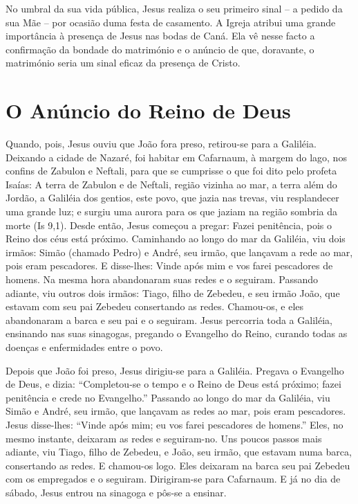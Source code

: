 \documentclass{rosario}
\begin{document}

No umbral da sua vida pública, Jesus realiza o seu primeiro sinal -- a pedido da sua Mãe -- por ocasião duma festa de casamento.
A Igreja atribui uma grande importância à presença de Jesus nas bodas de Caná.
Ela vê nesse facto a confirmação da bondade do matrimónio e o anúncio de que, doravante, o matrimónio seria um sinal eficaz da presença de Cristo.


\section{O Anúncio do Reino de Deus}


Quando, pois, Jesus ouviu que João fora preso, retirou-se para a Galiléia.
Deixando a cidade de Nazaré, foi habitar em Cafarnaum, à margem do lago, nos confins de Zabulon e Neftali,
para que se cumprisse o que foi dito pelo profeta Isaías:
A terra de Zabulon e de Neftali, região vizinha ao mar, a terra além do Jordão, a Galiléia dos gentios,
este povo, que jazia nas trevas, viu resplandecer uma grande luz;
e surgiu uma aurora para os que jaziam na região sombria da morte (Is 9,1).
Desde então, Jesus começou a pregar:
Fazei penitência, pois o Reino dos céus está próximo.
Caminhando ao longo do mar da Galiléia, viu dois irmãos:
Simão (chamado Pedro) e André, seu irmão, que lançavam a rede ao mar, pois eram pescadores.
E disse-lhes:
Vinde após mim e vos farei pescadores de homens.
Na mesma hora abandonaram suas redes e o seguiram.
Passando adiante, viu outros dois irmãos:
Tiago, filho de Zebedeu, e seu irmão João, que estavam com seu pai Zebedeu consertando as redes.
Chamou-os, e eles abandonaram a barca e seu pai e o seguiram.
Jesus percorria toda a Galiléia, ensinando nas suas sinagogas, pregando o Evangelho do Reino, curando todas as doenças e enfermidades entre o povo.


Depois que João foi preso, Jesus dirigiu-se para a Galiléia.
Pregava o Evangelho de Deus, e dizia:
``Completou-se o tempo e o Reino de Deus está próximo;
fazei penitência e crede no Evangelho.''
Passando ao longo do mar da Galiléia, viu Simão e André, seu irmão, que lançavam as redes ao mar, pois eram pescadores.
Jesus disse-lhes:
``Vinde após mim;
eu vos farei pescadores de homens.''
Eles, no mesmo instante, deixaram as redes e seguiram-no.
Uns poucos passos mais adiante, viu Tiago, filho de Zebedeu, e João, seu irmão, que estavam numa barca, consertando as redes.
E chamou-os logo.
Eles deixaram na barca seu pai Zebedeu com os empregados e o seguiram.
Dirigiram-se para Cafarnaum.
E já no dia de sábado, Jesus entrou na sinagoga e pôs-se a ensinar.
\end{document}
